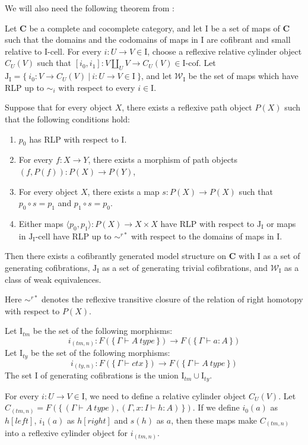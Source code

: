 \documentclass{mscs}
\newcommand{\cat}[1]{\mathbf{#1}}
\newcommand{\C}{\cat{C}}
\newcommand{\we}{\mathcal{W}}
\newcommand{\I}{\mathrm{I}}
\newcommand{\J}{\mathrm{J}}
\newcommand{\class}[2]{#1\text{-}\mathrm{#2}}
\newcommand{\Icell}[1][\I]{\class{#1}{cell}}
\newcommand{\Icof}[1][\I]{\class{#1}{cof}}
\newcommand{\Jcell}[1][]{\Icell[\J#1]}
\newcommand{\cyli}{i}
\numberwithin{figure}{section}
\begin{document}
We will also need the following theorem from \cite{f-model-structures}:
\begin{thm}
Let $\C$ be a complete and cocomplete category, and let $\I$ be a set of maps of $\C$
such that the domains and the codomains of maps in $\I$ are cofibrant and small relative to $\Icell$.
For every $i : U \to V \in \I$, choose a reflexive relative cylinder object $C_U(V)$
such that $[\cyli_0,\cyli_1] : V \amalg_U V \to C_U(V) \in \Icof$.
Let $\J_\I = \{\ \cyli_0 : V \to C_U(V)\ |\ i : U \to V \in \I \ \}$, and
let $\we_\I$ be the set of maps which have RLP up to $\sim_i$ with respect to every $i \in \I$.

Suppose that for every object $X$, there exists a reflexive path object $P(X)$ such that the following conditions hold:
\begin{enumerate}
\item $p_0$ has RLP with respect to $\I$.
\item For every $f : X \to Y$, there exists a morphism of path objects $(f,P(f)) : P(X) \to P(Y)$,
\item For every object $X$, there exists a map $s : P(X) \to P(X)$ such that $p_0 \circ s = p_1$ and $p_1 \circ s = p_0$.
\item Either maps $\langle p_0, p_1 \rangle : P(X) \to X \times X$ have RLP with respect to $\J_\I$
or maps in $\Jcell[_\I]$ have RLP up to $\sim^{r*}$ with respect to the domains of maps in $\I$.
\end{enumerate}
Then there exists a cofibrantly generated model structure on $\C$ with $\I$ as a set of generating cofibrations,
$\J_\I$ as a set of generating trivial cofibrations, and $\we_\I$ as a class of weak equivalences.
\end{thm}
Here $\sim^{r*}$ denotes the reflexive transitive closure of the relation of right homotopy with respect to $P(X)$.

Let $\I_{tm}$ be the set of the following morphisms:
\[ i_{(tm,n)} : F(\{\,\Gamma \vdash A\ type\,\}) \to F(\{\,\Gamma \vdash a : A\,\}) \]
Let $\I_{ty}$ be the set of the following morphisms:
\[ i_{(ty,n)} : F(\{\,\Gamma \vdash ctx\,\}) \to F(\{\,\Gamma \vdash A\ type\,\}) \]
The set $\I$ of generating cofibrations is the union $\I_{tm} \cup \I_{ty}$.

For every $i : U \to V \in \I$, we need to define a relative cylinder object $C_U(V)$.
Let $C_{(tm,n)} = F(\{\,(\Gamma \vdash A\ type), (\Gamma, x : I \vdash h : A)\,\})$.
If we define $\cyli_0(a)$ as $h[left]$, $\cyli_1(a)$ as $h[right]$ and $s(h)$ as $a$,
then these maps make $C_{(tm,n)}$ into a reflexive cylinder object for $i_{(tm,n)}$.
\end{document}
